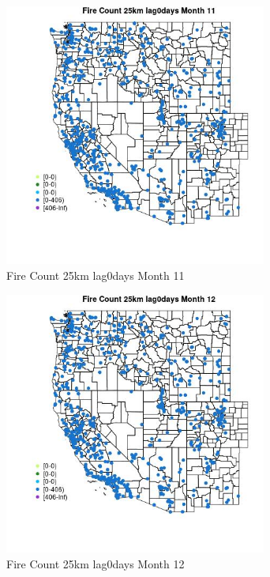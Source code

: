 \begin{figure} 
\centering  
\includegraphics[width=0.77\textwidth]{Code_Outputs/Report_ML_input_PM25_Step4_part_f_de_duplicated_aveswNAs_MapObsMo11Fire_Count_25km_lag0days.jpg} 
\caption{\label{fig:Report_ML_input_PM25_Step4_part_f_de_duplicated_aveswNAsMapObsMo11Fire_Count_25km_lag0days}Fire Count 25km lag0days Month 11} 
\end{figure} 
 

\begin{figure} 
\centering  
\includegraphics[width=0.77\textwidth]{Code_Outputs/Report_ML_input_PM25_Step4_part_f_de_duplicated_aveswNAs_MapObsMo12Fire_Count_25km_lag0days.jpg} 
\caption{\label{fig:Report_ML_input_PM25_Step4_part_f_de_duplicated_aveswNAsMapObsMo12Fire_Count_25km_lag0days}Fire Count 25km lag0days Month 12} 
\end{figure} 
 

